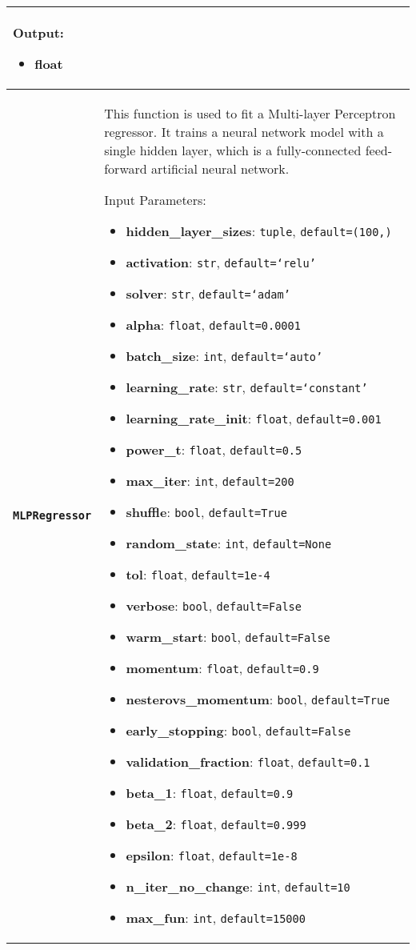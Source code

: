 \begin{longtable}{|l|p{12cm}|}
	Output:
	\begin{itemize}
		\item \textbf{float}
	\end{itemize} \\*
	\hline
	\textbf{\texttt{MLPRegressor}} &
	This function is used to fit a Multi-layer Perceptron regressor. It trains a neural network model with a single hidden layer, which is a fully-connected feed-forward artificial neural network.

	Input Parameters:
	\begin{itemize}
		\item \textbf{hidden\_layer\_sizes}: \texttt{tuple}, \texttt{default=(100,)}
		\item \textbf{activation}: \texttt{str}, \texttt{default=`relu'}
		\item \textbf{solver}: \texttt{str}, \texttt{default=`adam'}
		\item \textbf{alpha}: \texttt{float}, \texttt{default=0.0001}
		\item \textbf{batch\_size}: \texttt{int}, \texttt{default=`auto'}
		\item \textbf{learning\_rate}: \texttt{str}, \texttt{default=`constant'}
		\item \textbf{learning\_rate\_init}: \texttt{float}, \texttt{default=0.001}
		\item \textbf{power\_t}: \texttt{float}, \texttt{default=0.5}
		\item \textbf{max\_iter}: \texttt{int}, \texttt{default=200}
		\item \textbf{shuffle}: \texttt{bool}, \texttt{default=True}
		\item \textbf{random\_state}: \texttt{int}, \texttt{default=None}
		\item \textbf{tol}: \texttt{float}, \texttt{default=1e-4}
		\item \textbf{verbose}: \texttt{bool}, \texttt{default=False}
		\item \textbf{warm\_start}: \texttt{bool}, \texttt{default=False}
		\item \textbf{momentum}: \texttt{float}, \texttt{default=0.9}
		\item \textbf{nesterovs\_momentum}: \texttt{bool}, \texttt{default=True}
		\item \textbf{early\_stopping}: \texttt{bool}, \texttt{default=False}
		\item \textbf{validation\_fraction}: \texttt{float}, \texttt{default=0.1}
		\item \textbf{beta\_1}: \texttt{float}, \texttt{default=0.9}
		\item \textbf{beta\_2}: \texttt{float}, \texttt{default=0.999}
		\item \textbf{epsilon}: \texttt{float}, \texttt{default=1e-8}
		\item \textbf{n\_iter\_no\_change}: \texttt{int}, \texttt{default=10}
		\item \textbf{max\_fun}: \texttt{int}, \texttt{default=15000}
	\end{itemize}


\end{longtable}
